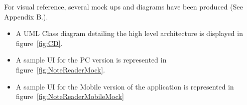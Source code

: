 For visual reference, several mock ups and diagrams have been produced (See Appendix B.).

\begin{itemize}
    \item A UML Class diagram detailing the high level architecture is displayed in figure~\ref{fig:CD}.
    \item A sample UI for the PC version is represented in figure~\ref{fig:NoteReaderMock}.
    \item A sample UI for the Mobile version of the application is represented in figure~\ref{fig:NoteReaderMobileMock}
\end{itemize}






